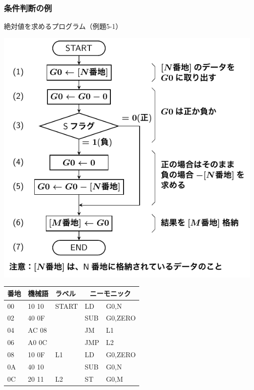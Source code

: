 \documentclass[handout]{beamer}        %
\begin{document}
\begin{frame}
  \frametitle{条件判断の例}
  絶対値を求めるプログラム（例題5-1）\\
  \vfill
  \begin{minipage}{0.49\columnwidth}
    \centerline{\includegraphics[scale=0.5]{../Tikz/flow1.pdf}}
  \end{minipage}
  \begin{minipage}{0.5\columnwidth}
    {\ttfamily\scriptsize\begin{center}
      \begin{tabular}{|l|l|l|l l|}
        \hline
        番地 & 機械語 & ラベル & \multicolumn{2}{|c|}{ニーモニック} \\
        \hline
        00 & 10 10 & START& LD   & G0,N    \\
        02 & 40 0F &      & SUB  & G0,ZERO \\
        04 & AC 08 &      & JM   & L1      \\
        06 & A0 0C &      & JMP  & L2      \\
        08 & 10 0F & L1   & LD   & G0,ZERO \\
        0A & 40 10 &      & SUB  & G0,N    \\
        0C & 20 11 & L2   & ST   & G0,M    \\

\end{tabular}
\end{center}}
\end{minipage}
\end{frame}
\end{document}
